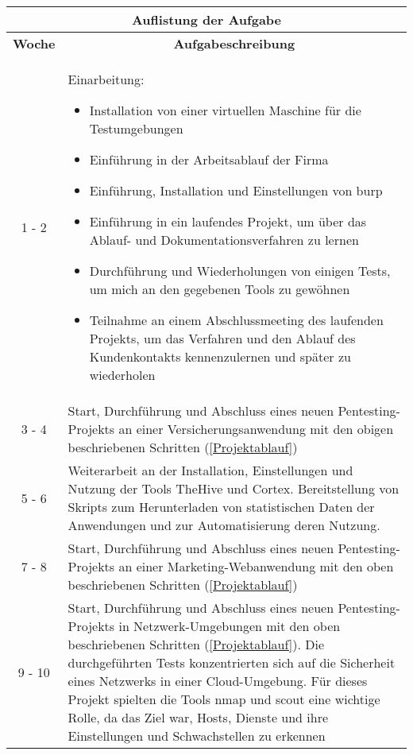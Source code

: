 \begin{table}[H]
    \begin{tabularx}{\textwidth}{|c|X|}
    \toprule
    \multicolumn{2}{c}{\textbf{Auflistung der Aufgabe}} \\
    \midrule
    \multicolumn{1}{c}{\textbf{Woche}} & \multicolumn{1}{c}{\textbf{Aufgabeschreibung}} \\
    \hline
    1 - 2    & Einarbeitung:
                \begin{itemize}
                    \item Installation von einer virtuellen Maschine für die Testumgebungen
                    \item Einführung in der Arbeitsablauf der Firma
                    \item Einführung, Installation und Einstellungen von \gls{burp}
                    \item Einführung in ein laufendes Projekt, um über das Ablauf- und Dokumentationsverfahren zu lernen
                    \item Durchführung und Wiederholungen von einigen Tests, um mich an den gegebenen Tools zu gewöhnen
                    \item Teilnahme an einem Abschlussmeeting des laufenden Projekts, um das Verfahren und den Ablauf des Kundenkontakts kennenzulernen und später zu wiederholen
                \end{itemize} \\
        \hline

    3 - 4       &  Start, Durchführung und Abschluss eines neuen Pentesting-Projekts an einer Versicherungsanwendung mit den obigen beschriebenen Schritten (\ref{Projektablauf})  \\ 
    
        \hline
    
    5 - 6       & Weiterarbeit an der Installation, Einstellungen und Nutzung der Tools \gls{TheHive} und \gls{Cortex}. Bereitstellung von Skripts zum Herunterladen von statistischen Daten der Anwendungen und zur Automatisierung deren Nutzung.  \\ 
    
        \hline
    
    7 - 8      &  Start, Durchführung und Abschluss eines neuen Pentesting-Projekts an einer Marketing-Webanwendung mit den oben beschriebenen Schritten (\ref{Projektablauf}) \\

    9 - 10  &  Start, Durchführung und Abschluss eines neuen Pentesting-Projekts in Netzwerk-Umgebungen mit den oben beschriebenen Schritten (\ref{Projektablauf}). Die durchgeführten Tests konzentrierten sich auf die Sicherheit eines Netzwerks in einer Cloud-Umgebung. Für dieses Projekt spielten die Tools \gls{nmap} und \gls{scout} eine wichtige Rolle, da das Ziel war, Hosts, Dienste und ihre Einstellungen und \gls{Schwachstelle}n zu erkennen \\


\end{tabularx}
\end{table}
